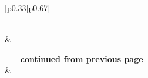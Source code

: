 \begin{longtable}{|p{}|p{}|}
    \toprule\noalign{}
    \caption{Fields of Projects}
    \label{tab:fields-meaning}                                                                               \\

    \hline
     &                              \\
    \hline
    \endfirsthead

    {{\bfseries \tablename\ \thetable{} -- continued from previous page}}                                    \\
    \hline
     &                              \\
    \hline
    \endhead

    \hline
                                                               \\ \hline
    \endfoot

    \hline \hline
    \endlastfoot


\end{longtable}
